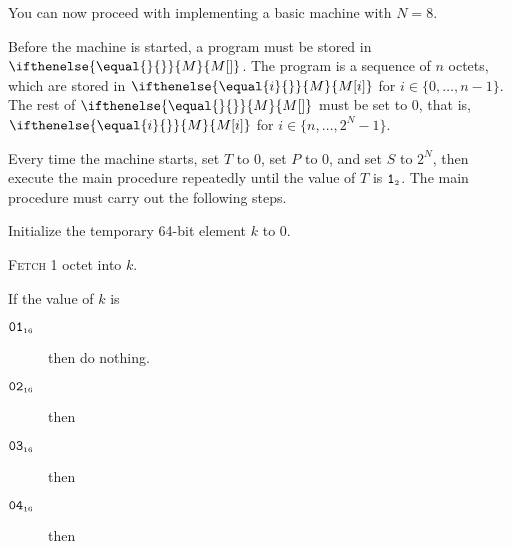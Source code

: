 \documentclass[a4paper,12pt]{article}
\newcommand{\num}[1]{\texttt{#1}}
\newcommand{\hex}[1]{\num{#1}_{\textup{\tiny 16}}}
\newcommand{\bin}[1]{\num{#1}_{\textup{\tiny 2}}}
\newcommand{\MEM}[1]{\ifthenelse{\equal{#1}{}}{M}{M[#1]}}
\newcommand{\PC}{P}
\newcommand{\SP}{S}
\newcommand{\TERM}{T}
\newcommand{\T}{\bin{1}}
\newcommand{\range}[2]{\{#1,\ldots,#2\}}
\newcommand{\proc}[1]{\textsc{#1}}
\newcommand{\op}[1]{$#1$}
\theoremstyle{definition}
\newcommand{\NOP}       [1]{\op{\hex{01}}}
\newcommand{\JUMP}      [1]{\op{\hex{02}}}
\newcommand{\JZFWD}     [1]{\op{\hex{03}}}
\newcommand{\JZBACK}    [1]{\op{\hex{04}}}
\begin{document}
You can now proceed with implementing a basic machine with $N=8$.

Before the machine is started, a program must be stored in $\MEM{}$.
The program is a sequence of $n$ octets, which are stored in $\MEM{i}$ for $i \in \range{0}{n-1}$.
The rest of $\MEM{}$ must be set to 0, that is, $\MEM{i}$ for $i \in \range{n}{2^N-1}$.

Every time the machine starts, set $\TERM$ to 0, set $\PC$ to $0$, and set $\SP$ to $2^N$, then execute the main procedure repeatedly until the value of $\TERM$ is $\T$.
The main procedure must carry out the following steps.
\begin{stepnumbers}
\item Initialize the temporary 64-bit element $k$ to 0.
\item \proc{Fetch} 1 octet into $k$.
\item\label{itm:main-case} If the value of $k$ is
  \begin{description}
  \item[\NOP{}] then do nothing.
  \item[\JUMP{}] then
  \item[\JZFWD{}] then
  \item[\JZBACK{}] then

\end{description}
\end{stepnumbers}
\end{document}
